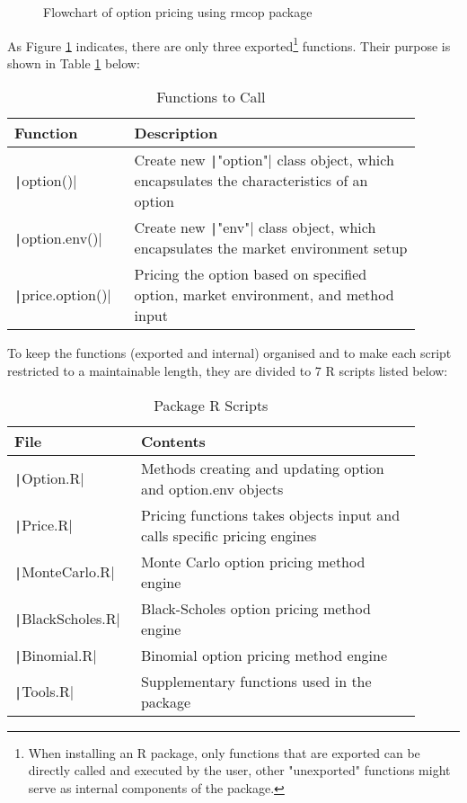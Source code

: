 \begin{figure}[H]
    \centering
    
    \caption{Flowchart of option pricing using rmcop package} \label{img:flowchart_option}
\end{figure}

As Figure \ref{img:flowchart_option} indicates, there are only three exported\footnote{When installing an R package, only functions that are exported can be directly called and executed by the user, other "unexported" functions might serve as internal components of the package.} functions. Their purpose is shown in Table \ref{tab:pkg_functions} below:

\begin{table}[H]
    \begin{tabular}{p{0.25\linewidth} | p{0.65\linewidth}}
    Function                            & Description \\ \hline
    \texttt|option()|            & Create new \texttt|"option"| class object, which encapsulates the characteristics of an option \\
    \texttt|option.env()|        & Create new \texttt|"env"| class object, which encapsulates the market environment setup \\
    \texttt|price.option()|      & Pricing the option based on specified option, market environment, and method input                       
    \end{tabular}
    \caption{Functions to Call} \label{tab:pkg_functions}
\end{table}
    
To keep the functions (exported and internal) organised and to make each script restricted to a maintainable length, they are divided to 7 R scripts listed below:

\begin{table}[H]
\begin{tabular}{p{0.25\linewidth} | p{0.65\linewidth}}
File                           & Contents \\ \hline
\texttt|Option.R|       & Methods creating and updating option and option.env objects \\
\texttt|Price.R|        & Pricing functions takes objects input and calls specific pricing engines \\
\texttt|MonteCarlo.R|   & Monte Carlo option pricing method engine \\
\texttt|BlackScholes.R| & Black-Scholes option pricing method engine \\
\texttt|Binomial.R|     & Binomial option pricing method engine \\
\texttt|Tools.R|        & Supplementary functions used in the package
\end{tabular}
\caption{Package R Scripts} \label{tab:pkg_scripts}
\end{table} 

